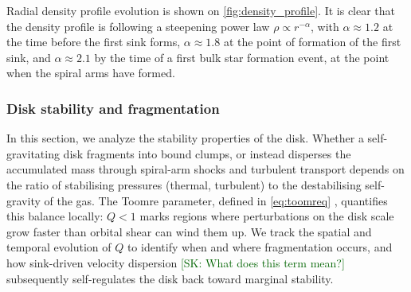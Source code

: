 \documentclass[twocolumn]{openjournal}
\newcommand{\kyr}{\,\mathrm{kyr}}
\newcommand{\tform}{t_1}
\newcommand{\skcomment}[1]{{\textcolor{darkgreen}{[SK: #1]}}}
\begin{document}


Radial density profile evolution is shown on \autoref{fig:density_profile}.
It is clear that the density profile is following a steepening power law
$\rho \propto r^{- \alpha}$, with $\alpha \approx 1.2$ at the time before
the first sink forms, $\alpha \approx 1.8$ at the point of formation
of the first sink, and $\alpha \approx 2.1$ by the time of a
first bulk star formation event, at the point when the spiral arms have formed.




\subsubsection{Disk stability and fragmentation}
\label{sec:stability}

In this section, we analyze the stability properties of the disk.
Whether a self-gravitating disk fragments into bound clumps, or instead disperses the accumulated mass through spiral-arm shocks and turbulent transport depends on the ratio of stabilising pressures (thermal, turbulent) to the destabilising self-gravity of the gas. The Toomre parameter, defined in \autoref{eq:toomreq} \citep{Toomre_1964}, quantifies this balance locally: $Q < 1$ marks regions where perturbations on the disk scale grow faster than orbital shear can wind them up.
We track the spatial and temporal evolution of $Q$ to identify when and where fragmentation occurs, and how sink-driven velocity dispersion \skcomment{What does this term mean?} subsequently self-regulates the disk back toward marginal stability.
\end{document}
